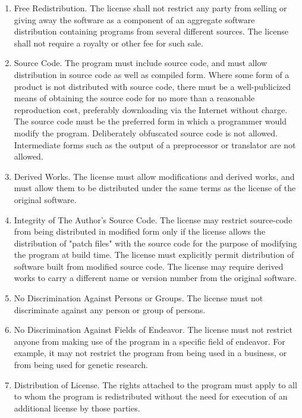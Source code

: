 \begin{enumerate}

\item{Free Redistribution}. The license shall not restrict any party from selling or giving away the software as a component of an aggregate software distribution containing programs from several different sources. The license shall not require a royalty or other fee for such sale.

\item{Source Code}. The program must include source code, and must allow distribution in source code as well as compiled form. Where some form of a product is not distributed with source code, there must be a well-publicized means of obtaining the source code for no more than a reasonable reproduction cost, preferably downloading via the Internet without charge. The source code must be the preferred form in which a programmer would modify the program. Deliberately obfuscated source code is not allowed. Intermediate forms such as the output of a preprocessor or translator are not allowed.

\item{Derived Works}. The license must allow modifications and derived works, and must allow them to be distributed under the same terms as the license of the original software.

\item{Integrity of The Author's Source Code}.
  The license may restrict source-code from being distributed in modified form only if the license allows the distribution of "patch files" with the source code for the purpose of modifying the program at build time. The license must explicitly permit distribution of software built from modified source code. The license may require derived works to carry a different name or version number from the original software.

\item{No Discrimination Against Persons or Groups}.
  The license must not discriminate against any person or group of persons.

\item{No Discrimination Against Fields of Endeavor}.
  The license must not restrict anyone from making use of the program in a specific field of endeavor. For example, it may not restrict the program from being used in a business, or from being used for genetic research.

\item{Distribution of License}.
  The rights attached to the program must apply to all to whom the program is redistributed without the need for execution of an additional license by those parties.


\end{enumerate}

